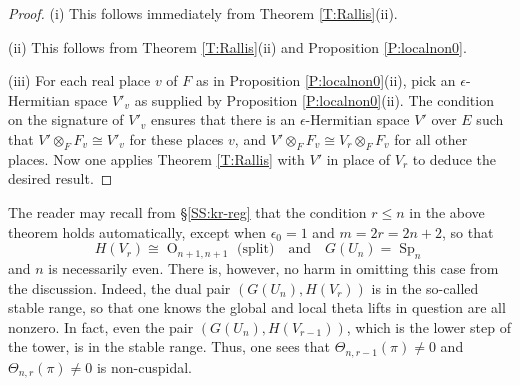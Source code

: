 \documentclass[10pt]{amsart}
\theoremstyle{plain}
\numberwithin{equation}{section}
\begin{document}
\begin{proof}
(i) This follows immediately from Theorem \ref{T:Rallis}(ii).
\vskip 5pt

\noindent (ii) This follows from Theorem \ref{T:Rallis}(ii) and Proposition \ref{P:localnon0}.
\vskip 5pt

\noindent (iii) For each real place $v$ of $F$ as in Proposition
\ref{P:localnon0}(ii), pick an $\epsilon$-Hermitian space $V'_v$ as
supplied by Proposition \ref{P:localnon0}(ii). The condition on the
signature of $V'_v$ ensures that there is an $\epsilon$-Hermitian
space $V'$ over $E$ such that $V' \otimes_F F_v \cong V'_v$ for these
places $v$, and 
$V' \otimes_F F_v \cong V_r \otimes_F F_v$ for all other places.   Now one
applies Theorem \ref{T:Rallis} with $V'$ in place of $V_r$ to
deduce the desired result.  
\end{proof}
 \vskip 5pt
 
 
 The reader may recall from \S \ref{SS:kr-reg} that the condition $r \leq n$ in the above theorem holds automatically, except when $\epsilon_ 0 = 1$ and  $m = 2r = 2n+2$, so that 
 \[  H(V_r) \cong {\operatorname{O}}_{n+1, n+1} \, \, \text{(split)} \quad \text{and} \quad G(U_n) = {\operatorname{Sp}}_n \]
 and $n$ is necessarily even. There is, however, no harm in omitting this case from the discussion. Indeed, the dual pair $(G(U_n), H(V_{r}))$ is in the so-called stable range, so that one knows the global and local theta lifts in question are all nonzero. 
 In fact, even the pair $(G(U_n), H(V_{r-1}))$, which is the lower step of the tower, is in the stable range. Thus,  one sees that $\Theta_{n,r-1}(\pi) \ne 0$  and $\Theta_{n,r}(\pi) \ne 0$ is non-cuspidal. 

 \vskip 15pt
   
\end{document}
